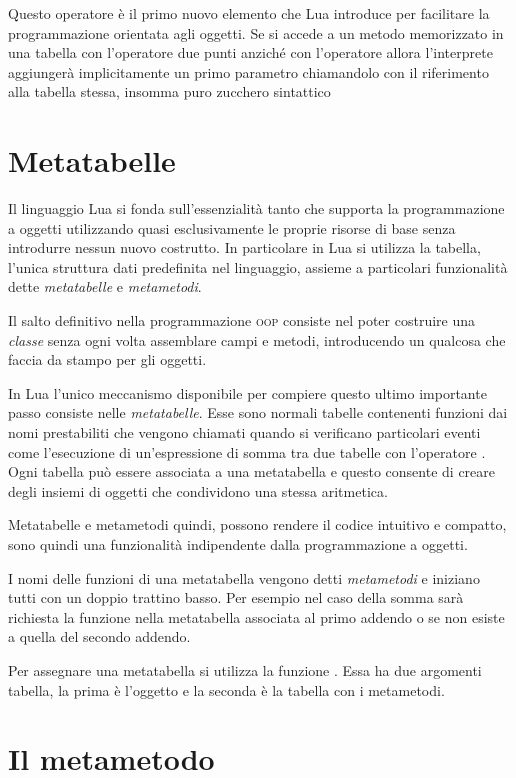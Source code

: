 Questo operatore è il primo nuovo elemento che Lua introduce per facilitare la
programmazione orientata agli oggetti. Se si accede a un metodo memorizzato in
una tabella con l'operatore due punti \key{:} anziché con l'operatore 
allora l'interprete aggiungerà implicitamente un primo parametro chiamandolo
 con il riferimento alla tabella stessa, insomma puro zucchero
sintattico


\section{Metatabelle}

Il linguaggio Lua si fonda sull'essenzialità tanto che supporta la
programmazione a oggetti utilizzando quasi esclusivamente le proprie risorse di
base senza introdurre nessun nuovo costrutto. In particolare in Lua si utilizza
la tabella, l'unica struttura dati predefinita nel linguaggio, assieme a
particolari funzionalità dette \emph{metatabelle} e \emph{metametodi}.

Il salto definitivo nella programmazione \textsc{oop} consiste nel poter
costruire una \emph{classe} senza ogni volta assemblare campi e metodi,
introducendo un qualcosa che faccia da stampo per gli oggetti.

In Lua l'unico meccanismo disponibile per compiere questo ultimo importante
passo consiste nelle \emph{metatabelle}. Esse sono normali tabelle contenenti
funzioni dai nomi prestabiliti che vengono chiamati quando si verificano
particolari eventi come l'esecuzione di un'espressione di somma tra due tabelle
con l'operatore \key{+}. Ogni tabella può essere associata a una metatabella e
questo consente di creare degli insiemi di oggetti che condividono una stessa
aritmetica.

Metatabelle e metametodi quindi, possono rendere il codice intuitivo e compatto,
sono quindi una funzionalità indipendente dalla programmazione a oggetti.

I nomi delle funzioni di una metatabella vengono detti \emph{metametodi} e
iniziano tutti con un doppio trattino basso. Per esempio nel caso della somma
sarà richiesta la funzione  nella metatabella associata al primo
addendo o se non esiste a quella del secondo addendo.

Per assegnare una metatabella si utilizza la funzione . Essa ha
due argomenti tabella, la prima è l'oggetto e la seconda è la tabella con i
metametodi.


\section{Il metametodo }

